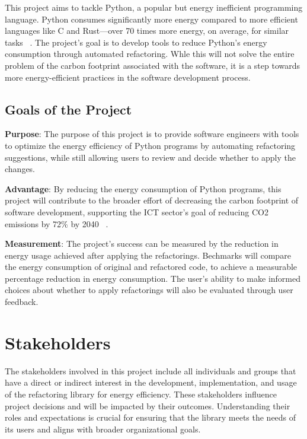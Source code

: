 \documentclass[12pt]{article}
\begin{document}
This project aims to tackle Python, a popular but energy inefficient programming language. Python consumes significantly more energy compared to more efficient languages like C and Rust—over 70 times more energy, on average, for similar tasks ~\citep{PereiraEtAl2017}. The project's goal is to develop tools to reduce Python's energy consumption through automated refactoring. Whle this will not solve the entire problem of the carbon footprint associated with the software, it is a step towards more energy-efficient practices in the software development process.

\subsection{Goals of the Project}
\noindent \textbf{Purpose}: The purpose of this project is to provide software engineers with tools to optimize the energy efficiency of Python programs by automating refactoring suggestions, while still allowing users to review and decide whether to apply the changes.

\noindent \textbf{Advantage}: By reducing the energy consumption of Python programs, this project will contribute to the broader effort of decreasing the carbon footprint of software development, supporting the ICT sector's goal of reducing CO2 emissions by 72\% by 2040 ~\citep{FreitagAndBernersLee2021}.

\noindent \textbf{Measurement}: The project's success can be measured by the reduction in energy usage 
achieved after applying the refactorings. Bechmarks will compare the energy consumption of original 
and refactored code, to achieve a measurable percentage reduction in energy consumption. The user's 
ability to make informed choices about whether to apply refactorings will also be evaluated through 
user feedback.

\section{Stakeholders}

The stakeholders involved in this project include all individuals and groups that have a direct or indirect interest in the development, implementation, and usage of the refactoring library for energy efficiency. These stakeholders influence project decisions and will be impacted by their outcomes. Understanding their roles and expectations is crucial for ensuring that the library meets the needs of its users and aligns with broader organizational goals.\\
\end{document}
